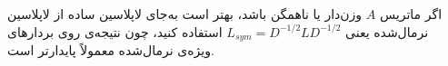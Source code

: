 \begin{warnbox}
اگر ماتریس $A$ وزن‌دار یا ناهمگن باشد، بهتر است به‌جای لاپلاسین ساده از لاپلاسین نرمال‌شده  یعنی $L_{sym} = D^{-1/2} L D^{-1/2}$ استفاده کنید، چون نتیجه‌ی  روی بردارهای ویژه‌ی نرمال‌شده معمولاً پایدارتر است.
\end{warnbox}
